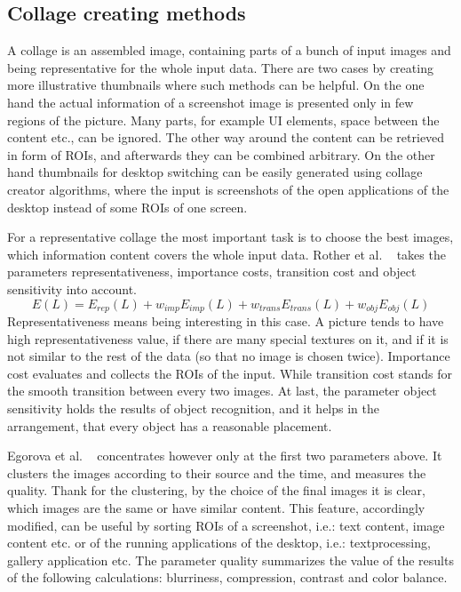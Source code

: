 \documentclass[draft,final]{vutinfth} %
\begin{document}
	\subsection{Collage creating methods} 
	A collage is an assembled image, containing parts of a bunch of input images and being representative for the whole input data.
	There are two cases by creating  more illustrative thumbnails where such methods can be helpful.
	On the one hand the actual information of a screenshot image is presented only in few regions of the picture.
	Many parts, for example UI elements, space between the content etc., can be ignored. 
	The other way around the content can be retrieved in form of ROIs, and afterwards they can be combined arbitrary.
	On the other hand thumbnails for desktop switching can be easily generated using collage creator algorithms, where the input is screenshots of the open applications of the desktop instead of some ROIs of one screen.\par
	For a representative collage the most important task is to choose the best images, which information content covers the whole input data.
	Rother et al. ~\cite{rother2006autocollage} takes the parameters representativeness, importance costs, transition cost and object sensitivity into account.
	\[ E(L)=E_{rep}(L)+w_{imp}E_{imp}(L)+w_{trans}E_{trans}(L)+w_{obj}E_{obj}(L) \]
	Representativeness means being interesting in this case.
	A picture tends to have high representativeness value, if there are many special textures on it, and if it is not similar to the rest of the data (so that no image is chosen twice).
	Importance cost evaluates and collects the ROIs of the input.
	While transition cost stands for the smooth transition between every two images.
	At last, the parameter object sensitivity holds the results of object recognition, and it helps in the arrangement, that every object has a reasonable placement.\par
	Egorova et al. ~\cite{egorova2008collage} concentrates however only at the first two parameters above.
	It clusters the images according to their source and the time, and measures the quality.
	Thank for the clustering, by the choice of the final images it is clear,  which images are the same or have similar content.
	This feature, accordingly modified, can be useful by sorting ROIs of a screenshot, i.e.: text content, image content etc. or of the running applications of the desktop, i.e.: textprocessing, gallery application etc.
	The parameter quality summarizes the value of the results of the following calculations: blurriness, compression, contrast and color balance.
\end{document}
